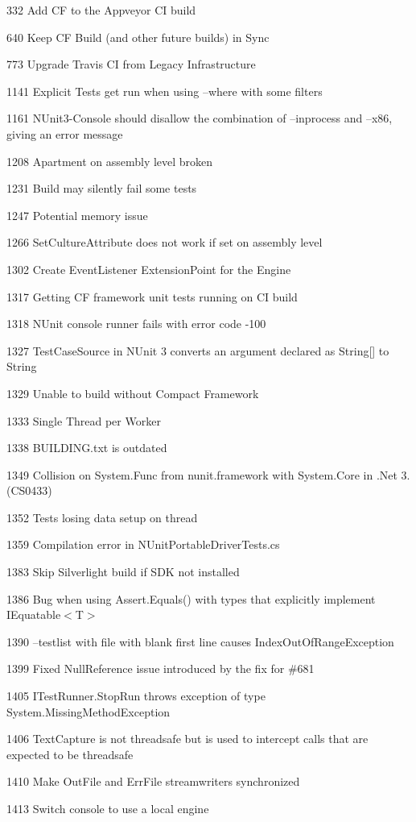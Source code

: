 \begin{DoxyItemize}
\item 332 Add CF to the Appveyor CI build
\item 640 Keep CF Build (and other future builds) in Sync
\item 773 Upgrade Travis CI from Legacy Infrastructure
\item 1141 Explicit Tests get run when using --where with some filters
\item 1161 N\+Unit3-\/\+Console should disallow the combination of --inprocess and --x86, giving an error message
\item 1208 Apartment on assembly level broken
\item 1231 Build may silently fail some tests
\item 1247 Potential memory issue
\item 1266 Set\+Culture\+Attribute does not work if set on assembly level
\item 1302 Create Event\+Listener Extension\+Point for the Engine
\item 1317 Getting CF framework unit tests running on CI build
\item 1318 N\+Unit console runner fails with error code -\/100
\item 1327 Test\+Case\+Source in N\+Unit 3 converts an argument declared as String\mbox{[}\mbox{]} to String
\item 1329 Unable to build without Compact Framework
\item 1333 Single Thread per Worker
\item 1338 B\+U\+I\+L\+D\+I\+N\+G.\+txt is outdated
\item 1349 Collision on System.\+Func from nunit.\+framework with System.\+Core in .Net 3. (C\+S0433)
\item 1352 Tests losing data setup on thread
\item 1359 Compilation error in N\+Unit\+Portable\+Driver\+Tests.\+cs
\item 1383 Skip Silverlight build if S\+DK not installed
\item 1386 Bug when using Assert.\+Equals() with types that explicitly implement {\ttfamily I\+Equatable$<$T$>$}
\item 1390 --testlist with file with blank first line causes Index\+Out\+Of\+Range\+Exception
\item 1399 Fixed Null\+Reference issue introduced by the fix for \#681
\item 1405 I\+Test\+Runner.\+Stop\+Run throws exception of type \textquotesingle{}System.\+Missing\+Method\+Exception\textquotesingle{}
\item 1406 Text\+Capture is not threadsafe but is used to intercept calls that are expected to be threadsafe
\item 1410 Make Out\+File and Err\+File streamwriters synchronized
\item 1413 Switch console to use a local engine
\end{DoxyItemize}

